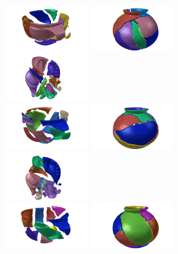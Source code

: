 \documentclass[acmlarge,screen,dvipsnames]{acmart}
\begin{document}
\begin{figure}[h]
  \includegraphics[width=0.33\textwidth]{images/ambercuppuzzle4}%
  \includegraphics[width=0.33\textwidth]{images/saltdeanpuzzle2}%
  \includegraphics[width=0.33\textwidth]{images/elephantpuzzle2}\\
  \includegraphics[width=0.33\textwidth]{images/ambercuppuzzle5}%
  \includegraphics[width=0.33\textwidth]{images/saltdeanpuzzle3}%
  \includegraphics[width=0.33\textwidth]{images/elephantpuzzle3}\\
  \includegraphics[width=0.33\textwidth]{images/ambercuppuzzle6}%
  \includegraphics[width=0.33\textwidth]{images/saltdeanpuzzle4}%

\end{figure}
\end{document}

